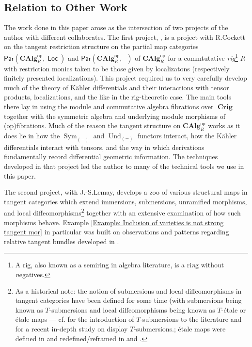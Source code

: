\documentclass{amsart}
\theoremstyle{definition}
\DeclareMathOperator{\sym}{Sym}
\DeclareMathOperator{\Crig}{\mathbf{Crig}}
\DeclareMathOperator{\op}{op}
\DeclareMathOperator{\Loc}{\mathsf{Loc}}
\DeclareMathOperator{\Locfp}{\mathsf{Loc}_{f.p.}}
\DeclareMathOperator{\und}{Und}
\newcommand{\CAlg}[1]{\mathbf{CAlg}_{#1}}
\newcommand{\Par}[2]{\mathsf{Par}({#1},{#2})}
\newcommand{\Und}[1]{\und_{#1}}
\newcommand{\Sym}[1]{\sym_{#1}}
\numberwithin{equation}{subsection}
\begin{document}
\subsection*{Relation to Other Work}
The work done in this paper arose as the intersection of two projects of the author with different collaborates. The first project, \cite{RobinMePartialMapRigs}, is a project with R.\@ Cockett on the tangent restriction structure on the partial map categories $\Par{\CAlg{R}^{\op}}{\Loc}$ and $\Par{\CAlg{R}^{\op}}{\Locfp}$ of $\CAlg{R}^{\op}$ for a commtutative \emph{rig}\footnote{A rig, also known as a semiring in algebra literature, is a ri\emph{n}g without \emph{n}egatives.} $R$ with restriction monics taken to be those given by localizatons (respectively finitely presented localizations).  This project required us to very carefully develop much of the theory of K{\"a}hler differentials and their interactions with tensor products, localizations, and the like in the rig-theoretic case. The main tools there lay in using the module and commutative algebra fibrations over $\Crig$ together with the symmetric algebra and underlying module morphisms of (op)fibrations. Much of the reason the tangent structure on $\CAlg{R}^{\op}$ works as it does lie in how the $\Sym{(-)}$ and $\Und{(-)}$ functors interact, how the K{\"a}hler differentials interact with tensors, and the way in which derivations fundamentally record differential geometric information. The techniques developed in that project led the author to many of the technical tools we use in this paper.

The second project, \cite{JSMeMapFlavoursInTanCats} with J.-S.\@ Lemay, develops a zoo of various structural maps in tangent categories which extend immersions, submersions, unramified morphisms, and local diffeomorphisms\footnote{As a historical note: the notion of submersions and local diffeomorphisms in tangent categories have been defined for some time (with submersions being known as $T$-submersions and local diffeomorphisms being known as $T$-{\'e}tale or {\'e}tale maps --- cf.\@ \cite{BenVectorBundles} for the introduction of $T$-submersions to the literature and \cite{GeoffMarcelloTSubmersionPaper} for a recent in-depth study on display $T$-submersions.; {\'e}tale maps were defined in \cite{GeoffJonBenACT2019} and redefined/reframed in \cite{BenThesis} and \cite{GeoffJSReverse}.} together with an extensive examination of how such morphisms behave. Example \ref{Example: Inclusion of varieties is not strong tangent mor} in particular was built on observations and patterns regarding relative tangent bundles developed in \cite{JSMeMapFlavoursInTanCats}.
\end{document}
